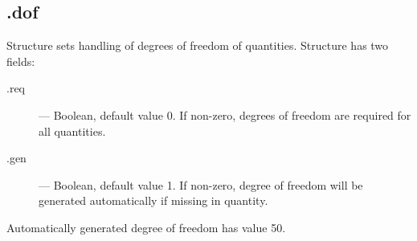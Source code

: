 \documentclass[12pt]{article} %
\begin{document}
\subsection{\textsf{.dof}} %
Structure sets handling of degrees of freedom of quantities. Structure has two fields:
\begin{description}
        \item [\textsf{.req}] ---  Boolean, default value 0. If non-zero, degrees of freedom are required for all quantities.
        \item [\textsf{.gen}] ---  Boolean, default value 1. If non-zero, degree of freedom will be generated
        automatically if missing in quantity.
\end{description}
Automatically generated degree of freedom has value 50.
\end{document}
